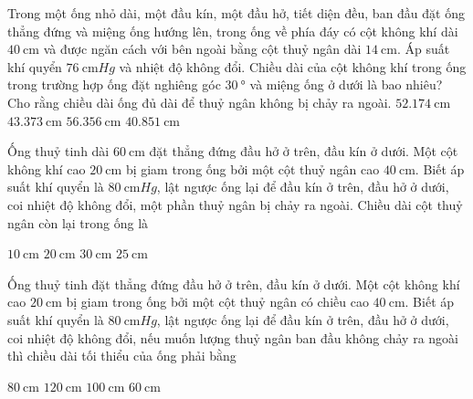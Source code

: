 \begin{ex}
	Trong một ống nhỏ dài, một đầu kín, một đầu hở, tiết diện đều, ban đầu đặt ống thẳng đứng và miệng ống hướng lên, trong ống về phía đáy có cột không khí dài $\SI{40}{\centi\meter}$ và được ngăn cách với bên ngoài bằng cột thuỷ ngân dài $\SI{14}{\centi\meter}$. Áp suất khí quyển $\SI{76}{\centi\meter Hg}$ và nhiệt độ không đổi. Chiều dài của cột không khí trong ống trong trường hợp ống đặt nghiêng góc $\SI{30}{\degree}$ và miệng ống ở dưới là bao nhiêu? Cho rằng chiều dài ống đủ dài để thuỷ ngân không bị chảy ra ngoài.
	\choice
	{\True $\SI{52.174}{\centi\meter}$}
	{$\SI{43.373}{\centi\meter}$}
	{$\SI{56.356}{\centi\meter}$}
	{$\SI{40.851}{\centi\meter}$}
\end{ex}
\begin{ex}
	Ống thuỷ tinh dài $\SI{60}{\centi\meter}$ đặt thẳng đứng đầu hở ở trên, đầu kín ở dưới. Một cột không khí cao $\SI{20}{\centi\meter}$ bị giam trong ống bởi một cột thuỷ ngân cao $\SI{40}{\centi\meter}$. Biết áp suất khí quyển là $\SI{80}{\centi\meter Hg}$, lật ngược ống lại để đầu kín ở trên, đầu hở ở dưới, coi nhiệt độ không đổi, một phần thuỷ ngân bị chảy ra ngoài. Chiều dài cột thuỷ ngân còn lại trong ống là

	\choice
	{$\SI{10}{\centi\meter}$}
	{\True $\SI{20}{\centi\meter}$}
	{$\SI{30}{\centi\meter}$}
	{$\SI{25}{\centi\meter}$}
\end{ex}
\begin{ex}
	Ống thuỷ tinh đặt thẳng đứng đầu hở ở trên, đầu kín ở dưới. Một cột không khí cao $\SI{20}{\centi\meter}$ bị giam trong ống bởi một cột thuỷ ngân có chiều cao $\SI{40}{\centi\meter}$. Biết áp suất khí quyển là $\SI{80}{\centi\meter Hg}$, lật ngược ống lại để đầu kín ở trên, đầu hở ở dưới, coi nhiệt độ không đổi, nếu muốn lượng thuỷ ngân ban đầu không chảy ra ngoài thì chiều dài tối thiểu của ống phải bằng
	
	\choice
	{$\SI{80}{\centi\meter}$}
	{$\SI{120}{\centi\meter}$}
	{\True $\SI{100}{\centi\meter}$}
	{$\SI{60}{\centi\meter}$}
\end{ex}
